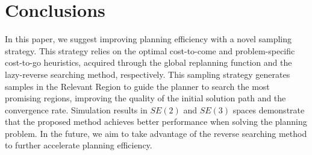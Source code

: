 \documentclass[a4paper,fleqn]{cas-dc}
\begin{document}
\maketitle











\section{Conclusions}
In this paper, we suggest improving planning efficiency with a novel sampling strategy. This strategy relies on the optimal cost-to-come and problem-specific cost-to-go heuristics, acquired through the global replanning function and the lazy-reverse searching method, respectively. This sampling strategy generates samples in the Relevant Region to guide the planner to search the most promising regions, improving the quality of the initial solution path and the convergence rate. Simulation results in $SE(2)$ and $SE(3)$ spaces demonstrate that the proposed method achieves better performance when solving the planning problem. In the future, we aim to take advantage of the reverse searching method to further accelerate planning efficiency.



\printcredits

%




\balance
\end{document}
